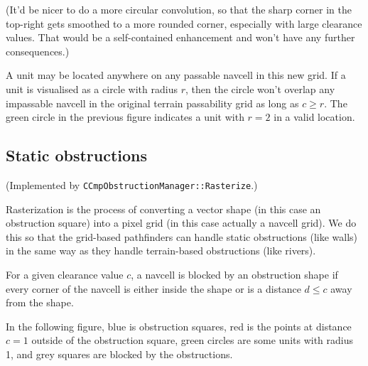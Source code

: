 \documentclass[a4paper,10pt]{article}
\begin{document}
(It'd be nicer to do a more circular convolution, so that the sharp corner
in the top-right gets smoothed to a more rounded corner,
especially with large clearance values.
That would be a self-contained enhancement and won't have any further consequences.)

A unit may be located anywhere on any passable navcell in this new grid.
If a unit is visualised as a circle with radius $r$,
then the circle won't overlap any impassable navcell in the
original terrain passability grid as long as $c \geq r$.
The green circle in the previous figure indicates a unit with $r=2$
in a valid location.

\subsection{Static obstructions}

(Implemented by \texttt{CCmpObstructionManager::Rasterize}.)

Rasterization is the process of converting a vector shape
(in this case an obstruction square)
into a pixel grid (in this case actually a navcell grid).
We do this so that the grid-based pathfinders can handle static obstructions (like walls)
in the same way as they handle terrain-based obstructions (like rivers).

For a given clearance value $c$,
a navcell is blocked by an obstruction shape
if every corner of the navcell
is either inside the shape or is a distance $d \leq c$ away from the shape.

In the following figure, blue is obstruction squares, red is the points at distance $c=1$
outside of the obstruction square,
green circles are some units with radius 1,
and grey squares are blocked by the obstructions.
\end{document}
